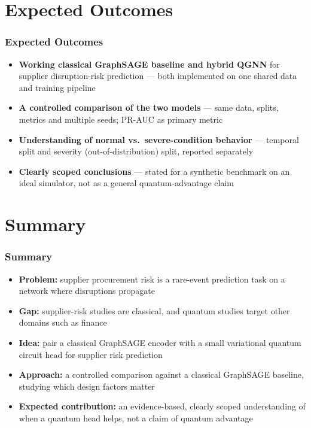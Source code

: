 \documentclass{beamer}
\newcommand{\bodyfont}{\small}
\begin{document}
\section{Expected Outcomes}
\begin{frame}[t]
\frametitle{Expected Outcomes}
\bodyfont
\begin{itemize}
\setlength{\itemsep}{12pt}
  \item \textbf{Working classical GraphSAGE baseline and hybrid QGNN} for
        supplier disruption-risk prediction --- both implemented on one
        shared data and training pipeline
  \item \textbf{A controlled comparison of the two models} --- same data,
        splits, metrics and multiple seeds; PR-AUC as primary metric
  \item \textbf{Understanding of normal vs.\ severe-condition behavior} ---
        temporal split and severity (out-of-distribution) split, reported
        separately
  \item \textbf{Clearly scoped conclusions} --- stated for a synthetic
        benchmark on an ideal simulator, not as a general quantum-advantage
        claim
\end{itemize}
\end{frame}
\section{Summary}
\begin{frame}
\frametitle{Summary}
\bodyfont
\begin{itemize}
  \item \textbf{Problem:} supplier procurement risk is a rare-event prediction
        task on a network where disruptions propagate
  \vspace{0.5em}
  \item \textbf{Gap:} supplier-risk studies are classical, and quantum studies
        target other domains such as finance
  \vspace{0.5em}
  \item \textbf{Idea:} pair a classical GraphSAGE encoder with a small
        variational quantum circuit head for supplier risk prediction
  \vspace{0.5em}
  \item \textbf{Approach:} a controlled comparison against a classical GraphSAGE
        baseline, studying which design factors matter
  \vspace{0.5em}
  \item \textbf{Expected contribution:} an evidence-based, clearly scoped
        understanding of when a quantum head helps, not a claim of quantum
        advantage
\end{itemize}
\end{frame}
\end{document}
